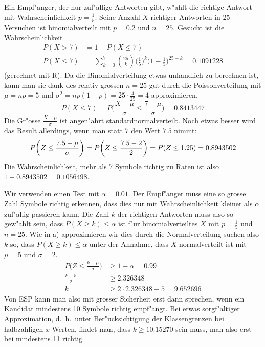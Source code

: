 \begin{loesung}
\begin{teilaufgaben}
\item Ein Empf"anger, der nur zuf"allige Antworten gibt, w"ahlt
die richtige Antwort mit Wahrscheinlichkeit $p=\frac15$.
Seine Anzahl $X$ richtiger Antworten in 25 Versuchen ist binomialverteilt mit
$p=0.2$ und $n=25$. Gesucht ist die Wahrscheinlichkeit
\begin{align*}
P(X > 7)&= 1 - P(X\le 7)\\
P(X\le 7)&=\sum_{k=0}^7\binom{25}{k}
\biggl(\frac15\biggr)^k
\biggl(1-\frac15\biggr)^{25-k}
 = 0.1091228
\end{align*}
(gerechnet mit R).
Da die Binomialverteilung etwas unhandlich zu berechnen ist, kann man sie
dank des relativ grossen $n=25$ gut durch die Poissonverteilung
mit $\mu=np=5$ und $\sigma^2=np(1-p)=25\cdot\frac{4}{25}=4$
approximieren.
\[
P(X\le 7)=P\biggl(\frac{X-\mu}{\sigma}\le \frac{7-\mu}{\sigma}\biggr)
=
0.8413447
\]
Die Gr"osse $\frac{X-\mu}{\sigma}$ ist angen"ahrt standardnormalverteilt.
Noch etwas besser wird das Result allerdings, wenn man statt $7$ den
Wert $7.5$ nimmt:
\[
P\biggl(Z\le\frac{7.5-\mu}{\sigma}\biggr)
=
P\biggl(Z\le \frac{7.5-2}{2}\biggr)
=
P(Z\le 1.25)=0.8943502\\
\]
Die Wahrscheinlichkeit, mehr als 7 Symbole richtig zu Raten ist
also $1-0.8943502= 0.1056498$.
\item
Wir verwenden einen Test mit $\alpha=0.01$.
Der Empf"anger muss eine so grosse Zahl Symbole richtig erkennen,
dass dies nur mit Wahrscheinlichkeit kleiner als $\alpha$ zuf"allig
passieren kann.
Die Zahl $k$ der richtigen Antworten muss also so gew"ahlt sein,
dass $P(X\ge k) \le \alpha$ ist f"ur binomialverteiltes $X$ mit $p=\frac15$
und $n=25$. Wie in a) approximieren wir dies durch die Normalverteilung
suchen also $k$ so, dass $P(X\ge k)\le\alpha$ unter der Annahme, dass
$X$ normalverteilt ist mit $\mu=5$ und $\sigma=2$.
\begin{align*}
P\biggl(Z\le \frac{k - \mu}{\sigma}\biggr)&\ge 1-\alpha=0.99\\
\frac{k-5}2&\ge 2.326348\\
k&\ge 2\cdot 2.326348 + 5=9.652696
\end{align*}
Von ESP kann man also mit grosser Sicherheit erst dann sprechen, wenn
ein Kandidat mindestens 10 Symbole richtig empf"angt.
Bei etwas sorgf"altiger Approximation, d.~h.~unter Ber"ucksichtigung
der Klassengrenzen bei halbzahligen $x$-Werten, findet man, dass
$k\ge 10.15270$ sein muss, man also erst bei mindestens 11 richtig

\end{teilaufgaben}
\end{loesung}

